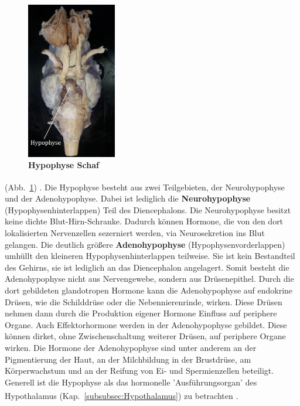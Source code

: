 \documentclass[12pt,a4paper,pdftex]{article}
\begin{document}
\begin{figure}
    \centering
    \includegraphics[width=0.35\textwidth]{pictures/Bilder_Jule/Schaf/Aussenansicht/Hypophyse.png}
    \caption[Hypophyse Schaf.]{\textbf{Hypophyse Schaf}}
    \label{fig:hypophyse}
\end{figure}

\noindent (Abb.~\ref{fig:hypophyse}) \textsuperscript{\cite[4]{trepel2011neuroanatomie}}. Die Hypophyse besteht aus zwei Teilgebieten, der Neurohypophyse und der Adenohypophyse. Dabei ist lediglich die \textbf{Neurohypophyse} (Hypophysenhinterlappen) Teil des Diencephalons. Die Neurohypophyse besitzt keine dichte Blut-Hirn-Schranke. Dadurch können Hormone, die von den dort lokalisierten Nervenzellen sezerniert werden, via Neurosekretion ins Blut gelangen. Die deutlich größere \textbf{Adenohypophyse} (Hypophysenvorderlappen) umhüllt den kleineren Hypophysenhinterlappen teilweise. Sie ist kein Bestandteil des Gehirns, sie ist lediglich an das Diencephalon angelagert. Somit besteht die Adenohypophyse nicht aus Nervengewebe, sondern aus Drüsenepithel. Durch die dort gebildeten glandotropen Hormone kann die Adenohypophyse auf endokrine Drüsen, wie die Schilddrüse oder die Nebennierenrinde, wirken. Diese Drüsen nehmen dann durch die Produktion eigener Hormone  Einfluss auf periphere Organe. Auch Effektorhormone werden in der Adenohypophyse gebildet. Diese können dirket, ohne Zwischenschaltung weiterer Drüsen, auf periphere Organe wirken. Die Hormone der Adenohypophyse sind unter anderem an der Pigmentierung der Haut, an der Milchbildung in der Brustdrüse, am Körperwachstum und an der Reifung von Ei- und Spermienzellen beteiligt. Generell ist die Hypophyse als das hormonelle 'Ausführungsorgan' des Hypothalamus (Kap.~\ref{subsubsec:Hypothalamus}) zu betrachten  \textsuperscript{\cite[8]{trepel2011neuroanatomie}}.
\end{document}
